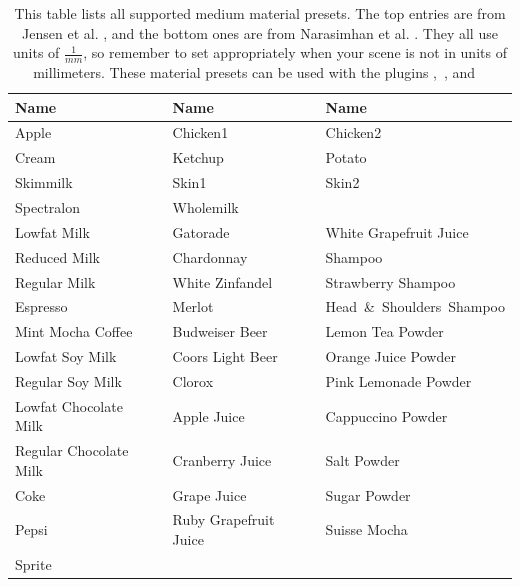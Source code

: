\begin{table}[h!]
    \centering
    \vspace{3mm}
    {\footnotesize
    \begin{tabular}{>{\ttfamily}p{3.8cm}p{.4cm}>{\ttfamily}p{3.8cm}p{.4cm}>{\ttfamily}p{3.8cm}}
        \toprule
        \rmfamily \small\textbf{Name} &&
        \rmfamily \small\textbf{Name} &&
        \rmfamily \small\textbf{Name} \\
        \cmidrule{1-1} \cmidrule{3-3} \cmidrule{5-5}
        Apple && Chicken1 && Chicken2 \\
        Cream && Ketchup  && Potato \\
        Skimmilk && Skin1 && Skin2 \\
        Spectralon && Wholemilk && \\
        \cmidrule{1-1} \cmidrule{3-3} \cmidrule{5-5}
        Lowfat Milk              &&  Gatorade                &&    White Grapefruit Juice     \\
        Reduced Milk             &&  Chardonnay              &&    Shampoo                    \\
        Regular Milk             &&  White Zinfandel         &&    Strawberry Shampoo         \\
        Espresso                 &&  Merlot                  &&    \mbox{Head \& Shoulders Shampoo}  \\
        Mint Mocha Coffee        &&  Budweiser Beer          &&    Lemon Tea Powder           \\
        Lowfat Soy Milk          &&  Coors Light Beer        &&    Orange Juice Powder        \\
        Regular Soy Milk         &&  Clorox                  &&    Pink Lemonade Powder       \\
        Lowfat Chocolate Milk    &&  Apple Juice             &&    Cappuccino Powder          \\
        Regular Chocolate Milk   &&  Cranberry Juice         &&    Salt Powder                \\
        Coke                     &&  Grape Juice             &&    Sugar Powder               \\
        Pepsi                    &&  Ruby Grapefruit Juice   &&    Suisse Mocha               \\
        Sprite                   &&                          &&                               \\
        \bottomrule
    \end{tabular}}
    \caption{\label{tbl:medium-coefficients}This
         table lists all supported medium material presets. The
         top entries are from Jensen et al. \cite{Jensen2001Practical}, and the
         bottom ones are from Narasimhan et al. \cite{Narasimhan2006Acquiring}.
         They all use units of $\frac{1}{mm}$, so remember to set
          appropriately when your scene is not
         in units of millimeters.
         These material presets can be used with the plugins
         ,\
         , and \
    }
\end{table}
